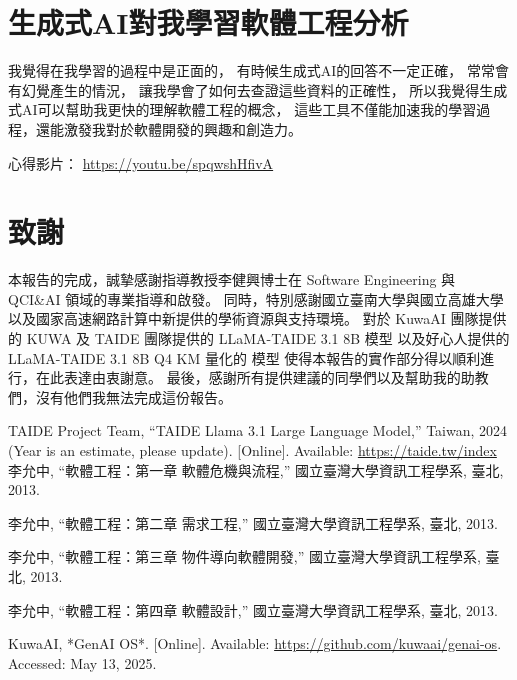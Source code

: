 \documentclass[twocolumn,11pt,a4paper]{article}
\begin{document}
\section{生成式AI對我學習軟體工程分析}
我覺得在我學習的過程中是正面的，
有時候生成式AI的回答不一定正確，
常常會有幻覺產生的情況，
讓我學會了如何去查證這些資料的正確性，
所以我覺得生成式AI可以幫助我更快的理解軟體工程的概念，
這些工具不僅能加速我的學習過程，還能激發我對於軟體開發的興趣和創造力。


\noindent 心得影片： \url{https://youtu.be/spqwshHfivA} \\


\section*{致謝}
本報告的完成，誠摯感謝指導教授李健興博士在
Software Engineering 與 QCI\&AI 領域的專業指導和啟發。
同時，特別感謝國立臺南大學與國立高雄大學以及國家高速網路計算中新提供的學術資源與支持環境。
對於 KuwaAI 團隊提供的 KUWA 及 TAIDE 團隊提供的 LLaMA-TAIDE 3.1 8B 模型 以及好心人提供的 LLaMA-TAIDE 3.1 8B Q4 KM 量化的 模型
使得本報告的實作部分得以順利進行，在此表達由衷謝意。
最後，感謝所有提供建議的同學們以及幫助我的助教們，沒有他們我無法完成這份報告。

\begin{thebibliography}{9}

{TAIDE Project Team}, ``{TAIDE Llama 3.1 Large Language Model},'' {Taiwan}, {2024} (Year is an estimate, please update). [Online]. Available: \url{https://taide.tw/index}
李允中, ``軟體工程：第一章 軟體危機與流程,'' 國立臺灣大學資訊工程學系, 臺北, 2013.

李允中, ``軟體工程：第二章 需求工程,'' 國立臺灣大學資訊工程學系, 臺北, 2013.

李允中, ``軟體工程：第三章 物件導向軟體開發,'' 國立臺灣大學資訊工程學系, 臺北, 2013.

李允中, ``軟體工程：第四章 軟體設計,'' 國立臺灣大學資訊工程學系, 臺北, 2013.

KuwaAI, *GenAI OS*. [Online]. Available: \url{https://github.com/kuwaai/genai-os}. Accessed: May 13, 2025.

\end{thebibliography}
\end{document}
